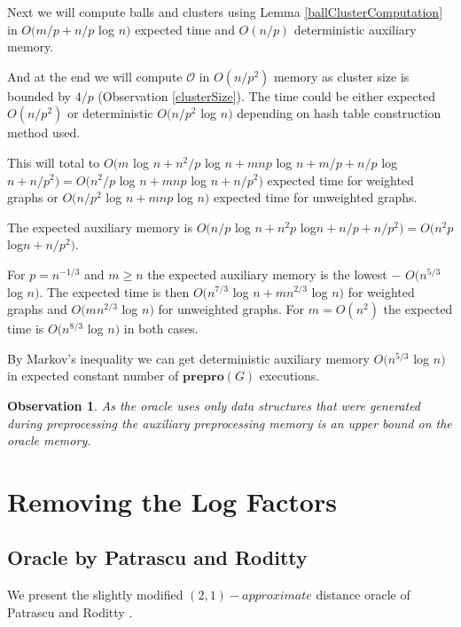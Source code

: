 \documentclass[shortabstract, lic, english]{iithesis}
\theoremstyle{definition} \newtheorem{definition}{Definition}[chapter]
\theoremstyle{plain} \newtheorem{remark}[definition]{Observation}
\theoremstyle{plain} \newtheorem{theorem}[definition]{Theorem}
\theoremstyle{plain} \newtheorem{lemma}[definition]{Lemma}
\theoremstyle{plain} \newtheorem{conjecture}[definition]{Conjecture}
\begin{document}
Next we will compute balls and clusters using Lemma \ref{ballClusterComputation} in $O(m/p + n/p $ log $ n)$ expected time and $O(n/p)$ deterministic auxiliary memory.

And at the end we will compute $\mathcal{O}$ in $O(n/p^2)$ memory as cluster size is bounded by $4/p$ (Observation \ref{clusterSize}).
The time could be either expected $O(n/p^2)$ or deterministic $O(n/p^2 $ log $ n)$ depending on hash table construction method used.

This will total to $O(m $ log $ n + n^2/p $ log $ n + mnp$ log $ n + m/p + n/p $ log $ n + n/p^2) = O(n^2/p $ log $ n + mnp$ log $ n + n/p^2)$ expected time for weighted graphs
or $O(n/p^2 $ log $n + mnp $ log $n)$ expected time for unweighted graphs.

The expected auxiliary memory is $O(n/p $ log $ n + n^2p$ log$ n + n/p + n/p^2) = O(n^2p$ log$ n + n/p^2)$.

For $p = n^{-1/3}$ and $m \geq n$ the expected auxiliary memory is the lowest $-$ $O(n^{5/3} $ log $ n)$.
The expected time is then $O(n^{7/3} $ log $ n + mn^{2/3}$ log $ n)$ for weighted graphs and
$O(mn^{2/3}$ log $ n)$ for unweighted graphs. For $m = O(n^2)$ the expected time is $O(n^{8/3} $ log $n)$ in both cases.

By Markov's inequality we can get deterministic auxiliary memory $O(n^{5/3} $ log $ n)$ in expected constant number of $\mathbf{prepro}(G)$ executions.

\begin{remark}
As the oracle uses only data structures that were generated during preprocessing the auxiliary preprocessing memory is an upper bound on the oracle memory.
\end{remark}



\chapter{Removing the Log Factors} \label{21TheoreticalComparison}

\section{Oracle by Patrascu and Roditty} \label{21OraclePatRod}

We present the slightly modified $(2,1)-approximate$ distance oracle of Patrascu and Roditty \cite{21OracleLessMemory}.
\end{document}
